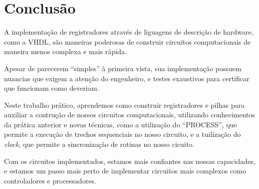 \documentclass{article}
\begin{document}
\section{Conclusão}

A implementação de registradores através de liguagens de descrição de hardware, como a VHDL, são maneiras poderosas de construir circuitos computacionais de maneira menos complexa e mais rápida.

Apesar de parecerem ``simples'' à primeira vista, sua implementação possuem nuancias que exigem a atenção do engenheiro, e testes exaustivos para certificar que funcionam como deveriam.

Neste trabalho prático, aprendemos como construir registradores e pilhas para auxiliar a contrução de nossos circuitos computacionais, utilizando conhecimentos da prática anterior e novas técnicas, como a utilização do ``PROCESS'', que permite a execução de trechos sequenciais no nosso circuito, e a tuilização do \textit{clock},  que permite a sincronização de rotinas no nosso cicuito.

Com os circuitos implementados, estamos mais confiantes nas nossas capacidades, e estamos um passo mais perto de implementar circuitos mais complexos como controladores e processadores.
\end{document}
